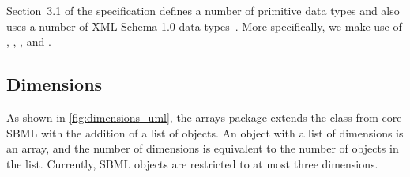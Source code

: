 Section~3.1 of the \sbmlthreecore specification defines a number of primitive data types and also uses a number of XML Schema 1.0 data types~\citep{biron:2000}.   More specifically, we make use of ,  ,  , and .    







\subsection{Dimensions}
\label{sec:dimension}

As shown in \ref{fig:dimensions_uml}, the arrays package extends the \SBase class from core SBML with the addition of a list of \Dimension objects.   An object with a list of dimensions is an array, and the number of dimensions is equivalent to the number of \Dimension objects in the list.   Currently, SBML objects are restricted to at most three dimensions.  


